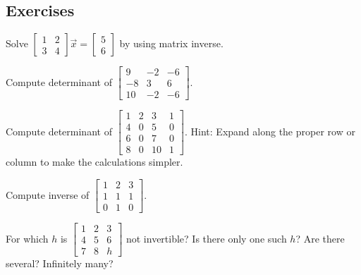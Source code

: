\subsection{Exercises}

\begin{exercise}
Solve
$\left[ \begin{smallmatrix}
1 & 2 \\
3 & 4 
\end{smallmatrix} \right] \vec{x} =
\left[ \begin{smallmatrix}
5 \\
6
\end{smallmatrix} \right]$ by using matrix inverse.
\end{exercise}

\begin{exercise}
Compute determinant of
$\left[ \begin{smallmatrix}
9 & -2 & -6 \\
-8 & 3 & 6 \\
10 & -2 & -6
\end{smallmatrix} \right]$.
\end{exercise}

\begin{exercise}
Compute determinant of
$\left[ \begin{smallmatrix}
1 & 2 & 3 & 1 \\
4 & 0 & 5 & 0 \\
6 & 0 & 7 & 0 \\
8 & 0 & 10 & 1
\end{smallmatrix} \right]$.  Hint: Expand along the proper row or column to
make the calculations simpler.
\end{exercise}

\begin{exercise}
Compute inverse of
$\left[ \begin{smallmatrix}
1 & 2 & 3 \\
1 & 1 & 1 \\
0 & 1 & 0
\end{smallmatrix} \right]$.
\end{exercise}

\begin{exercise}
For which $h$ is
$\left[ \begin{smallmatrix}
1 & 2 & 3 \\
4 & 5 & 6 \\
7 & 8 & h
\end{smallmatrix} \right]$
not invertible?  Is there only one such $h$?  Are there several?  Infinitely
many?
\end{exercise}

